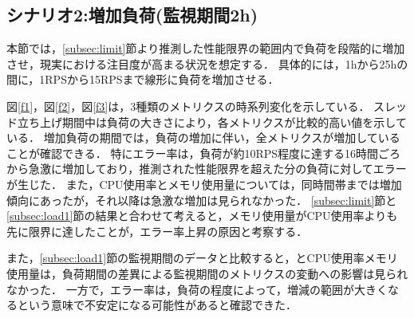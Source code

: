 \documentclass[twoside,twocolumn,10pt]{jarticle}  %
\begin{document}
\subsection{シナリオ2:増加負荷(監視期間2h)}\label{subsec:load2}

本節では，\ref{subsec:limit}節より推測した性能限界の範囲内で負荷を段階的に増加させ，現実における注目度が高まる状況を想定する．
具体的には，1hから25hの間に，1RPSから15RPSまで線形に負荷を増加させる．

図\ref{f1}，図\ref{f2}，図\ref{f3}は，3種類のメトリクスの時系列変化を示している．
スレッド立ち上げ期間中は負荷の大きさにより，各メトリクスが比較的高い値を示している．
増加負荷の期間では，負荷の増加に伴い，全メトリクスが増加していることが確認できる．
特にエラー率は，負荷が約10RPS程度に達する16時間ごろから急激に増加しており，推測された性能限界を超えた分の負荷に対してエラーが生じた．
また，CPU使用率とメモリ使用量については，同時間帯までは増加傾向にあったが，それ以降は急激な増加は見られなかった．
\ref{subsec:limit}節と\ref{subsec:load1}節の結果と合わせて考えると，メモリ使用量がCPU使用率よりも先に限界に達したことが，エラー率上昇の原因と考察する．

また，\ref{subsec:load1}節の監視期間のデータと比較すると，とCPU使用率メモリ使用量は，負荷期間の差異による監視期間のメトリクスの変動への影響は見られなかった．
一方で，エラー率は，負荷の程度によって，増減の範囲が大きくなるという意味で不安定になる可能性があると確認できた．
\end{document}
